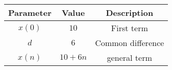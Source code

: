 \begin{tabular}{|c|c|c|}
    \hline
    \textbf{Parameter} & \textbf{Value} & \textbf{Description} \\
    \hline
    $x(0)$ & $10$ & First term \\
    \hline
    $d$ & $6$ & Common difference \\
    \hline 
    $x(n)$ & $10+6n$ & general term \\
    \hline 
\end{tabular}

